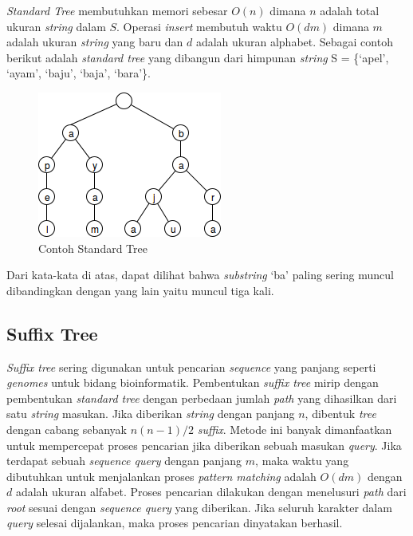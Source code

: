 \textit{Standard Tree} membutuhkan memori sebesar $O(n)$ dimana $n$ adalah total ukuran \textit{string} dalam $S$. Operasi \textit{insert} membutuh waktu $O(dm)$ dimana $m$ adalah ukuran \textit{string} yang baru dan $d$ adalah ukuran alphabet. Sebagai contoh berikut adalah \textit{standard tree} yang dibangun dari himpunan \textit{string} S = \{`apel', `ayam', `baju', `baja', `bara'\}.
\begin{figure}
    \centering
    \includegraphics[scale=0.6]{pics/Contoh-StandardTrie}
    \caption{Contoh Standard Tree}
    \label{fig:contoh-standard-tree}
\end{figure}

\noindent Dari kata-kata di atas, dapat dilihat bahwa \textit{substring} `ba' paling sering muncul dibandingkan dengan yang lain yaitu muncul tiga kali.

\subsection{Suffix Tree} \label{sec:suffix-tree}
\textit{Suffix tree} sering digunakan untuk pencarian \textit{sequence} yang panjang seperti \textit{genomes} untuk bidang bioinformatik. Pembentukan \textit{suffix tree} \citep{ukkonen1995line} mirip dengan pembentukan \textit{standard tree} dengan perbedaan jumlah \textit{path} yang dihasilkan dari satu \textit{string} masukan. Jika diberikan \textit{string} dengan panjang $n$, dibentuk \textit{tree} dengan cabang sebanyak $n(n-1)/2$ \textit{suffix}.  Metode ini banyak dimanfaatkan untuk mempercepat proses pencarian jika diberikan sebuah masukan \textit{query}. Jika terdapat sebuah \textit{sequence query} dengan panjang $m$, maka waktu yang dibutuhkan untuk menjalankan proses \textit{pattern matching} adalah $O(dm)$ dengan $d$ adalah ukuran alfabet. Proses pencarian dilakukan dengan menelusuri \textit{path} dari \textit{root} sesuai dengan \textit{sequence query} yang diberikan. Jika seluruh karakter dalam \textit{query} selesai dijalankan, maka proses pencarian dinyatakan berhasil. 


